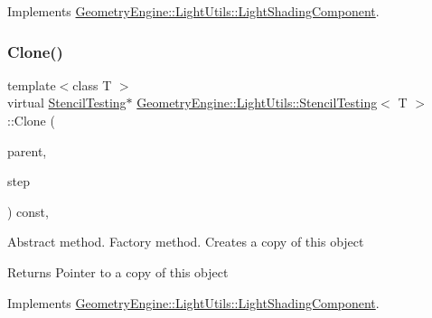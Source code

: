 Implements \mbox{\hyperlink{class_geometry_engine_1_1_light_utils_1_1_light_shading_component_a6684875f549753d00b91adbf62c88789}{Geometry\+Engine\+::\+Light\+Utils\+::\+Light\+Shading\+Component}}.

\mbox{\label{class_geometry_engine_1_1_light_utils_1_1_stencil_testing_a213b9b0be58d6f4481465abfbcc15cfb}} 
\subsubsection{\texorpdfstring{Clone()}{Clone()}}
{\footnotesize\ttfamily template$<$class T $>$ \\
virtual \mbox{\hyperlink{class_geometry_engine_1_1_light_utils_1_1_stencil_testing}{Stencil\+Testing}}$\ast$ \mbox{\hyperlink{class_geometry_engine_1_1_light_utils_1_1_stencil_testing}{Geometry\+Engine\+::\+Light\+Utils\+::\+Stencil\+Testing}}$<$ T $>$\+::Clone (\begin{DoxyParamCaption}\item[{\mbox{\hyperlink{class_geometry_engine_1_1_light_utils_1_1_light_component_manager}{Light\+Component\+Manager}} $\ast$}]{parent,  }\item[{\mbox{\hyperlink{namespace_geometry_engine_1_1_light_utils_a16eb370137c2fd151e6f8e1d07cd23e0}{Light\+Shading}}}]{step }\end{DoxyParamCaption}) const\hspace{0.3cm}{\ttfamily [inline]}, {\ttfamily [virtual]}}

Abstract method. Factory method. Creates a copy of this object \begin{DoxyReturn}{Returns}
Pointer to a copy of this object 
\end{DoxyReturn}


Implements \mbox{\hyperlink{class_geometry_engine_1_1_light_utils_1_1_light_shading_component_a8f2107f451b130b6f4e7042cafbc8210}{Geometry\+Engine\+::\+Light\+Utils\+::\+Light\+Shading\+Component}}.

\mbox{\label{class_geometry_engine_1_1_light_utils_1_1_stencil_testing_a5b6025533f2fa86ca69e8f91709ce418}} 
